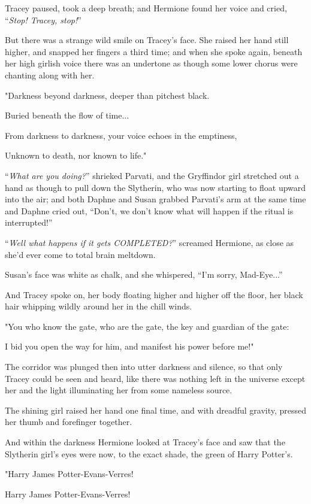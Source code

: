 Tracey paused, took a deep breath; and Hermione found her voice and cried, ``\emph{Stop! Tracey, stop!}''

But there was a strange wild smile on Tracey's face. She raised her hand still higher, and snapped her fingers a third time; and when she spoke again, beneath her high girlish voice there was an undertone as though some lower chorus were chanting along with her.

"Darkness beyond darkness, deeper than pitchest black.

Buried beneath the flow of time...

From darkness to darkness, your voice echoes in the emptiness,

Unknown to death, nor known to life."

``\emph{What are you doing?}'' shrieked Parvati, and the Gryffindor girl stretched out a hand as though to pull down the Slytherin, who was now starting to float upward into the air; and both Daphne and Susan grabbed Parvati's arm at the same time and Daphne cried out, ``Don't, we don't know what will happen if the ritual is interrupted!''

``\emph{Well what happens if it gets COMPLETED?}'' screamed Hermione, as close as she'd ever come to total brain meltdown.

Susan's face was white as chalk, and she whispered, ``I'm sorry, Mad-Eye...''

And Tracey spoke on, her body floating higher and higher off the floor, her black hair whipping wildly around her in the chill winds.

"You who know the gate, who are the gate, the key and guardian of the gate:

I bid you open the way for him, and manifest his power before me!"

The corridor was plunged then into utter darkness and silence, so that only Tracey could be seen and heard, like there was nothing left in the universe except her and the light illuminating her from some nameless source.

The shining girl raised her hand one final time, and with dreadful gravity, pressed her thumb and forefinger together.

And within the darkness Hermione looked at Tracey's face and saw that the Slytherin girl's eyes were now, to the exact shade, the green of Harry Potter's.

"Harry James Potter-Evans-Verres!

Harry James Potter-Evans-Verres!


